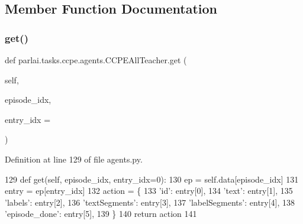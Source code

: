 \subsection{Member Function Documentation}
\mbox{\label{classparlai_1_1tasks_1_1ccpe_1_1agents_1_1CCPEAllTeacher_aca16523f7aa61db6fc1c3fa561334521}} 
\subsubsection{\texorpdfstring{get()}{get()}}
{\footnotesize\ttfamily def parlai.\+tasks.\+ccpe.\+agents.\+C\+C\+P\+E\+All\+Teacher.\+get (\begin{DoxyParamCaption}\item[{}]{self,  }\item[{}]{episode\+\_\+idx,  }\item[{}]{entry\+\_\+idx = {} }\end{DoxyParamCaption})}



Definition at line 129 of file agents.\+py.


\begin{DoxyCode}
129     \textcolor{keyword}{def }get(self, episode\_idx, entry\_idx=0):
130         ep = self.data[episode\_idx]
131         entry = ep[entry\_idx]
132         action = \{
133             \textcolor{stringliteral}{'id'}: entry[0],
134             \textcolor{stringliteral}{'text'}: entry[1],
135             \textcolor{stringliteral}{'labels'}: entry[2],
136             \textcolor{stringliteral}{'textSegments'}: entry[3],
137             \textcolor{stringliteral}{'labelSegments'}: entry[4],
138             \textcolor{stringliteral}{'episode\_done'}: entry[5],
139         \}
140         \textcolor{keywordflow}{return} action
141 
\end{DoxyCode}
\mbox{\label{classparlai_1_1tasks_1_1ccpe_1_1agents_1_1CCPEAllTeacher_a0f9ed996020d75cb7e204f72465f46d6}} 
